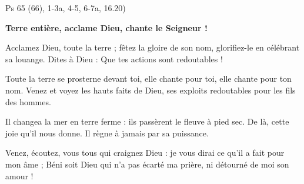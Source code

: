 Ps 65 (66), 1-3a, 4-5, 6-7a, 16.20)

\textbf{Terre entière, acclame Dieu,
chante le Seigneur !}
\smallskip

Acclamez Dieu, toute la terre ;
fêtez la gloire de son nom,
glorifiez-le en célébrant sa louange.
Dites à Dieu : \og Que tes actions sont redoutables ! \fg{}
\smallskip

Toute la terre se prosterne devant toi,
elle chante pour toi, elle chante pour ton nom.
Venez et voyez les hauts faits de Dieu,
ses exploits redoutables pour les fils des hommes.
\smallskip

Il changea la mer en terre ferme :
ils passèrent le fleuve à pied sec.
De là, cette joie qu’il nous donne.
Il règne à jamais par sa puissance.
\smallskip

Venez, écoutez, vous tous qui craignez Dieu :
je vous dirai ce qu’il a fait pour mon âme ;
Béni soit Dieu qui n’a pas écarté ma prière,
ni détourné de moi son amour !
